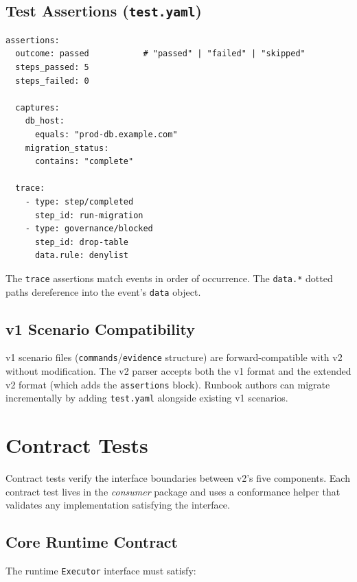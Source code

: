 \subsection{Test Assertions (\texttt{test.yaml})}

\begin{verbatim}
assertions:
  outcome: passed           # "passed" | "failed" | "skipped"
  steps_passed: 5
  steps_failed: 0

  captures:
    db_host:
      equals: "prod-db.example.com"
    migration_status:
      contains: "complete"

  trace:
    - type: step/completed
      step_id: run-migration
    - type: governance/blocked
      step_id: drop-table
      data.rule: denylist
\end{verbatim}

The \texttt{trace} assertions match events in order of occurrence. The \texttt{data.*} dotted paths dereference into the event's \texttt{data} object.

\subsection{v1 Scenario Compatibility}

v1 scenario files (\texttt{commands}/\texttt{evidence} structure) are forward-compatible with v2 without modification. The v2 parser accepts both the v1 format and the extended v2 format (which adds the \texttt{assertions} block). Runbook authors can migrate incrementally by adding \texttt{test.yaml} alongside existing v1 scenarios.

\section{Contract Tests}

Contract tests verify the interface boundaries between v2's five components. Each contract test lives in the \emph{consumer} package and uses a conformance helper that validates any implementation satisfying the interface.

\subsection{Core Runtime Contract}

The runtime \texttt{Executor} interface must satisfy:

